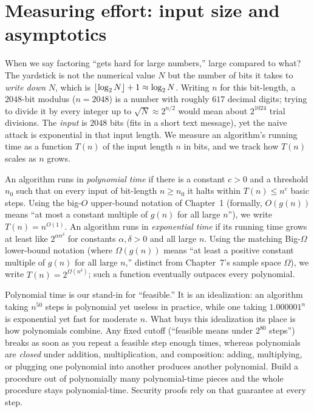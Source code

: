 \section{Measuring effort: input size and asymptotics}
\label{ch08:size}

When we say factoring ``gets hard for large numbers,'' large compared to what? The yardstick is not the numerical value $N$ but the number of bits it takes to \emph{write down} $N$, which is $\lfloor\log_2 N\rfloor + 1 \approx \log_2 N$. Writing $n$ for this bit-length, a $2048$-bit modulus ($n = 2048$) is a number with roughly $617$ decimal digits; trying to divide it by every integer up to $\sqrt{N} \approx 2^{n/2}$ would mean about $2^{1024}$ trial divisions. The \emph{input} is $2048$ bits (fits in a short text message), yet the naive attack is exponential in that input length. We measure an algorithm's running time as a function $T(n)$ of the input length $n$ in bits, and we track how $T(n)$ scales as $n$ grows.

\begin{definition}
\label{ch08:def-polytime}
An algorithm runs in \emph{polynomial time} if there is a constant $c > 0$ and a threshold $n_0$ such that on every input of bit-length $n \ge n_0$ it halts within $T(n) \le n^{c}$ basic steps. Using the big-$O$ upper-bound notation of Chapter~1 (formally, $O(g(n))$ means ``at most a constant multiple of $g(n)$ for all large $n$''), we write $T(n) = n^{O(1)}$. An algorithm runs in \emph{exponential time} if its running time grows at least like $2^{\alpha n^{\delta}}$ for constants $\alpha, \delta > 0$ and all large $n$. Using the matching Big-$\Omega$ lower-bound notation (where $\Omega(g(n))$ means ``at least a positive constant multiple of $g(n)$ for all large $n$,'' distinct from Chapter~7's sample space $\Omega$), we write $T(n) = 2^{\Omega(n^{\delta})}$; such a function eventually outpaces every polynomial.
\end{definition}

Polynomial time is our stand-in for ``feasible.'' It is an idealization: an algorithm taking $n^{50}$ steps is polynomial yet useless in practice, while one taking $1.000001^{n}$ is exponential yet fast for moderate $n$. What buys this idealization its place is how polynomials combine. Any fixed cutoff (``feasible means under $2^{80}$ steps'') breaks as soon as you repeat a feasible step enough times, whereas polynomials are \emph{closed} under addition, multiplication, and composition: adding, multiplying, or plugging one polynomial into another produces another polynomial. Build a procedure out of polynomially many polynomial-time pieces and the whole procedure stays polynomial-time. Security proofs rely on that guarantee at every step.

